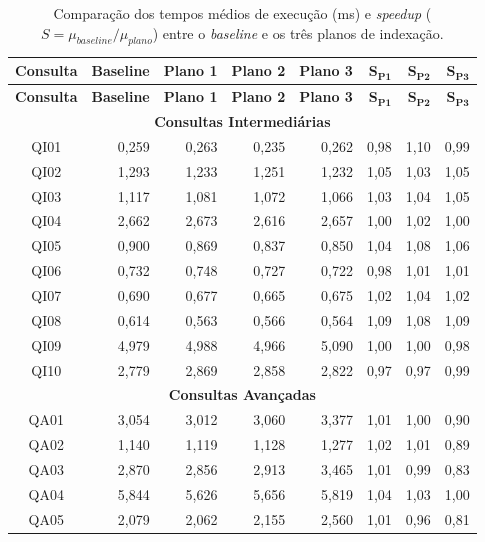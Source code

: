 \begin{longtable}{|c|r|r|r|r|r|r|r|}
\caption{Compara\c{c}\~ao dos tempos m\'edios de execu\c{c}\~ao (ms) e \emph{speedup} ($S = \mu_{baseline}/\mu_{plano}$) entre o \emph{baseline} e os tr\^es planos de indexa\c{c}\~ao.}
\label{tab:comparativo-planos}\\
\hline
\textbf{Consulta} & \textbf{Baseline} & \textbf{Plano 1} & \textbf{Plano 2} & \textbf{Plano 3} & $\boldsymbol{S_{P1}}$ & $\boldsymbol{S_{P2}}$ & $\boldsymbol{S_{P3}}$ \\
\hline
\endfirsthead
\hline
\textbf{Consulta} & \textbf{Baseline} & \textbf{Plano 1} & \textbf{Plano 2} & \textbf{Plano 3} & $\boldsymbol{S_{P1}}$ & $\boldsymbol{S_{P2}}$ & $\boldsymbol{S_{P3}}$ \\
\hline
\endhead
\multicolumn{8}{|c|}{\textbf{Consultas Intermedi\'arias}} \\
\hline
QI01 & 0,259 & 0,263 & 0,235 & 0,262 & 0,98 & 1,10 & 0,99 \\
QI02 & 1,293 & 1,233 & 1,251 & 1,232 & 1,05 & 1,03 & 1,05 \\
QI03 & 1,117 & 1,081 & 1,072 & 1,066 & 1,03 & 1,04 & 1,05 \\
QI04 & 2,662 & 2,673 & 2,616 & 2,657 & 1,00 & 1,02 & 1,00 \\
QI05 & 0,900 & 0,869 & 0,837 & 0,850 & 1,04 & 1,08 & 1,06 \\
QI06 & 0,732 & 0,748 & 0,727 & 0,722 & 0,98 & 1,01 & 1,01 \\
QI07 & 0,690 & 0,677 & 0,665 & 0,675 & 1,02 & 1,04 & 1,02 \\
QI08 & 0,614 & 0,563 & 0,566 & 0,564 & 1,09 & 1,08 & 1,09 \\
QI09 & 4,979 & 4,988 & 4,966 & 5,090 & 1,00 & 1,00 & 0,98 \\
QI10 & 2,779 & 2,869 & 2,858 & 2,822 & 0,97 & 0,97 & 0,99 \\
\hline
\multicolumn{8}{|c|}{\textbf{Consultas Avan\c{c}adas}} \\
\hline
QA01 & 3,054 & 3,012 & 3,060 & 3,377 & 1,01 & 1,00 & 0,90 \\
QA02 & 1,140 & 1,119 & 1,128 & 1,277 & 1,02 & 1,01 & 0,89 \\
QA03 & 2,870 & 2,856 & 2,913 & 3,465 & 1,01 & 0,99 & 0,83 \\
QA04 & 5,844 & 5,626 & 5,656 & 5,819 & 1,04 & 1,03 & 1,00 \\
QA05 & 2,079 & 2,062 & 2,155 & 2,560 & 1,01 & 0,96 & 0,81 \\

\end{longtable}
